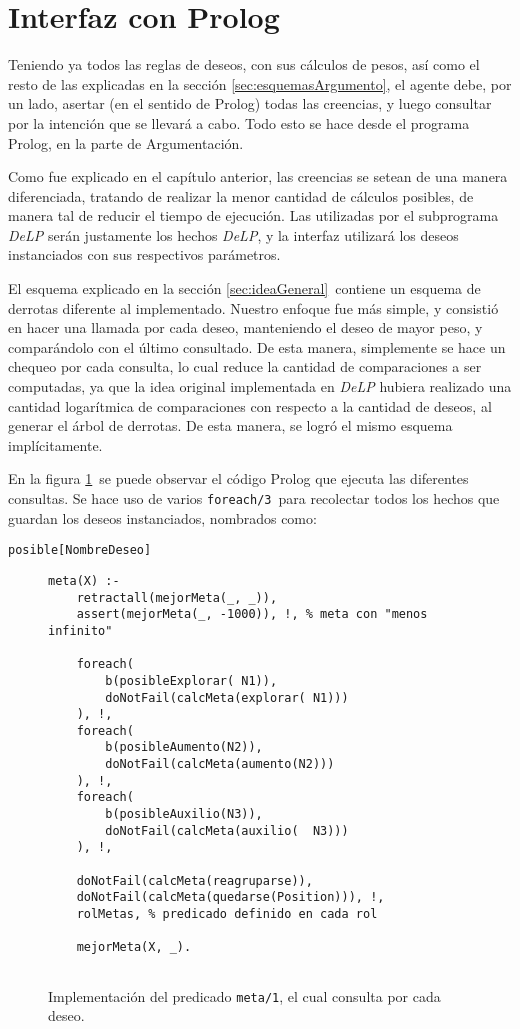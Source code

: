 \documentclass[oneside]{book}
\begin{document}
\section{Interfaz con Prolog}

Teniendo ya todos las reglas de deseos, con sus cálculos de pesos, así como el resto 
de las explicadas en la sección \ref{sec:esquemasArgumento}, el agente debe, por un 
lado, asertar (en el sentido de Prolog) todas las creencias, y luego consultar por 
la intención que se llevará a cabo. Todo esto se hace desde el programa Prolog, en
la parte de Argumentación.

Como fue explicado en el capítulo anterior, %
las creencias se setean de una manera diferenciada, tratando de realizar la menor
cantidad de cálculos posibles, de manera tal de reducir el tiempo de ejecución. Las
utilizadas por el subprograma \textit{DeLP} serán justamente los hechos \textit{DeLP}, 
y la interfaz utilizará los deseos instanciados con sus respectivos parámetros.

El esquema explicado en la sección \ref {sec:ideaGeneral}\ contiene un esquema de 
derrotas diferente al implementado. Nuestro enfoque fue más simple, y consistió en 
hacer una llamada por cada deseo, manteniendo el deseo de mayor peso, y comparándolo 
con el último consultado. De esta manera, simplemente se hace un chequeo por cada 
consulta, lo cual reduce la cantidad de comparaciones a ser computadas, ya que la idea 
original implementada en \textit{DeLP} hubiera realizado una cantidad logarítmica de 
comparaciones con respecto a la cantidad de deseos, al generar el árbol de derrotas. De 
esta manera, se logró el mismo esquema implícitamente.

En la figura \ref{fig:interfazProlog}\ se puede observar el código Prolog que 
ejecuta las diferentes consultas. Se hace uso de varios \texttt{foreach/3}\ para 
recolectar todos los hechos que guardan los deseos instanciados, nombrados como:

\begin{verbatim}
posible[NombreDeseo]
\end{verbatim}

\begin{figure}
\begin{verbatim}
meta(X) :- 
    retractall(mejorMeta(_, _)),
    assert(mejorMeta(_, -1000)), !, % meta con "menos infinito"
    
    foreach(
        b(posibleExplorar( N1)), 
        doNotFail(calcMeta(explorar( N1)))
    ), !,
    foreach(
        b(posibleAumento(N2)), 
        doNotFail(calcMeta(aumento(N2)))
    ), !, 
    foreach(
        b(posibleAuxilio(N3)), 
        doNotFail(calcMeta(auxilio(  N3)))
    ), !,
    
	doNotFail(calcMeta(reagruparse)),
    doNotFail(calcMeta(quedarse(Position))), !,
    rolMetas, % predicado definido en cada rol
    
    mejorMeta(X, _).
    
\end{verbatim}
\caption{Implementación del predicado \texttt{meta/1}, el cual consulta por cada 
deseo.}
\label{fig:interfazProlog}
\end{figure}
\end{document}
